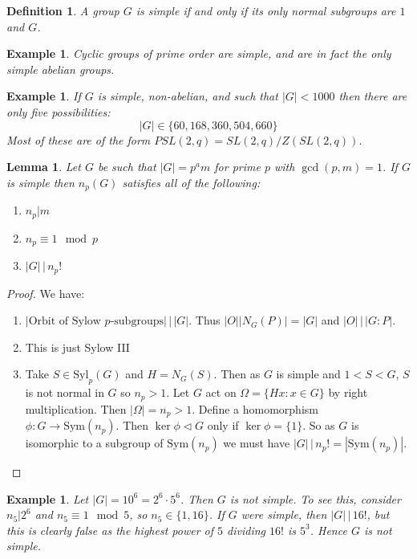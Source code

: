 \documentclass[a4paper,10pt]{article}
\newtheorem{Def}[thm]{Definition}
\newtheorem{eg}[thm]{Example}
\newtheorem{Lem}[thm]{Lemma}
\begin{document}
\begin{Def}
A group $G$ is simple if and only if its only normal subgroups are $1$ and $G$. 
\end{Def}

\begin{eg}
Cyclic groups of prime order are simple, and are in fact the only simple abelian groups. 
\end{eg}

\begin{eg}
If $G$ is simple, non-abelian, and such that $|G| < 1000$ then there are only five possibilities:
\[ |G| \in \{ 60, 168, 360, 504, 660 \} \]
Most of these are of the form $PSL(2,q) = SL(2,q) / Z(SL(2,q))$.
\end{eg}

\begin{Lem}
Let $G$ be such that $|G| = p^a m$ for prime $p$ with $\gcd(p,m) = 1$. If $G$ is simple then $n_p(G)$ satisfies all of the following:
\begin{enumerate}
\item $n_p | m$
\item $n_p \equiv 1 \mod p$
\item $|G| \, \big| \, n_p!$
\end{enumerate}
\end{Lem}

\begin{proof}
We have:
\begin{enumerate}
\item $|\text{Orbit of Sylow }p\text{-subgroups}| \, \big| \, |G|$. Thus $|O| |N_G(P)| = |G|$ and $|O| \, \big| \, |G:P|$.
\item This is just Sylow III
\item Take $S \in \text{Syl}_p(G)$ and $H = N_G(S)$. Then as $G$ is simple and $1 < S < G$, $S$ is not normal in $G$ so $n_p > 1$. Let $G$ act on $\Omega = \{ Hx : x \in G \}$ by right multiplication. Then $|\Omega| = n_p > 1$. Define a homomorphism $\phi : G \rightarrow \text{Sym}(n_p)$. Then $\ker \phi \triangleleft G$ only if $\ker \phi = \{1\}$. So as $G$ is isomorphic to a subgroup of $\text{Sym}(n_p)$ we must have $|G| \, \big| \, n_p! = |\text{Sym}(n_p)|$. 
\end{enumerate}
\end{proof}

\begin{eg}
Let $|G| = 10^6 = 2^6 \cdot 5^6$. Then $G$ is not simple. To see this, consider $n_5 | 2^6$ and $n_5 \equiv 1 \mod 5$, so $n_5 \in \{1, 16\}$. If $G$ were simple, then $|G| \, \big| \, 16!$, but this is clearly false as the highest power of $5$ dividing $16!$ is $5^3$. Hence $G$ is not simple. 
\end{eg}
\end{document}
